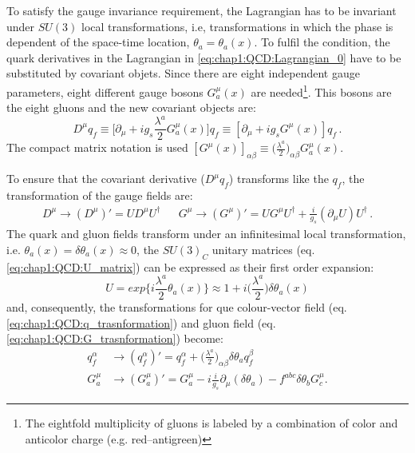 To satisfy the gauge invariance requirement, the Lagrangian has to be invariant under $SU(3)$ local transformations, i.e, transformations in which 
the phase is dependent of the space-time location, $\theta_{a} = \theta_{a} (x)$. To fulfil the condition, the quark derivatives in the 
Lagrangian in \ref{eq:chap1:QCD:Lagrangian_0} have to  be substituted by covariant objets. Since there are eight independent gauge 
parameters, eight different gauge  bosons $G_{a}^{\mu}(x)$ are needed\footnote{The eightfold multiplicity of gluons is labeled by a combination of color and anticolor charge (e.g. red–antigreen)}. 
This bosons are the eight gluons and  the new covariant objects are:
\begin{equation*}
	D^{\mu}q_{f} \equiv \big[ \partial_{\mu}  + i g_{s} \frac{\lambda^{a}}{2} G_{a}^{\mu}(x) \big] q_{f} \equiv [ \partial_{\mu}  + i g_{s} G^{\mu}(x) ] q_{f} \, .
\end{equation*}
The compact matrix notation is used  $[G^{\mu}(x)]_{\alpha \beta} \equiv \big( \frac{\lambda^{a}}{2} \big)_{\alpha \beta} G_{a}^{\mu}(x)$.

To ensure that the covariant derivative ($D^{\mu}q_{f}$) transforms like the $q_f$, the transformation of the gauge fields are:
\begin{align}\label{eq:chap1:QCD:G_trasnformation}
	D^{\mu} \rightarrow (D^{\mu})'  = UD^{\mu}U^{\dagger} && G^{\mu} \rightarrow (G^{\mu})' = UG^{\mu}U^{\dagger}+\frac{i}{g_{s}} (\partial_{\mu} U )U^{\dagger} \, .
\end{align}
The quark and gluon fields transform under an infinitesimal local transformation, i.e. $\theta_{a} (x) =  \delta \theta_{a}(x) \approx 0$, the $SU(3)_C$ unitary matrices (eq. \ref{eq:chap1:QCD:U_matrix}) can be expressed as their first order expansion:
\begin{equation*}
	U = exp \big\{ i \frac{\lambda^{a}}{2}\theta_{a}(x) \big\} \approx 1 + i \big( \frac{\lambda^{a}}{2} \big) \delta \theta_{a}(x)
\end{equation*}
and, consequently, the transformations for que colour-vector field (eq. \ref{eq:chap1:QCD:q_trasnformation}) and 
gluon field (eq. \ref{eq:chap1:QCD:G_trasnformation}) become:
\begin{align*}
	q^{\alpha}_{f}	& \rightarrow (q^{\alpha}_{f})' = q^{\alpha}_{f} + \big( \frac{\lambda^{a}}{2} \big)_{\alpha \beta} \delta \theta_{a} q_{f}^{\beta} \\
	G_{a}^{\mu}	& \rightarrow (G_{a}^{\mu})' =  G_{a}^{\mu} - i \frac{i}{g_{s}} \partial_{\mu} (\delta \theta_{a}) - f^{abc}\delta \theta_{b}G_{c}^{\mu}.
 \end{align*}
 

